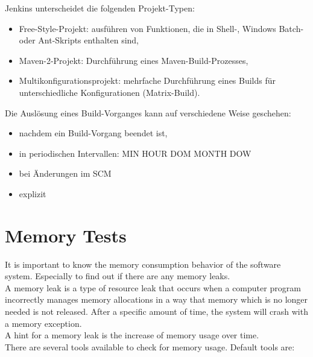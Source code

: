 Jenkins unterscheidet die folgenden Projekt-Typen:
\begin{itemize}
\item Free-Style-Projekt: ausführen von Funktionen, die in Shell-,
  Windows Batch- oder Ant-Skripts enthalten sind,
\item Maven-2-Projekt: Durchführung eines Maven-Build-Prozesses,
\item Multikonfigurationsprojekt: mehrfache Durchführung
  eines Builds für unterschiedliche Konfigurationen (Matrix-Build).
\end{itemize}
Die Auslösung eines Build-Vorganges kann auf verschiedene Weise
geschehen:
\begin{itemize}
\item nachdem ein Build-Vorgang beendet ist,
\item in periodischen Intervallen: MIN HOUR DOM MONTH DOW
\item bei Änderungen im SCM
\item explizit
\end{itemize}
%
%
\newslide

\section{Memory Tests}
It is important to know the memory consumption behavior of the
software system. Especially to find out if there are any memory leaks.\\
A memory leak is a type of resource leak that occurs when a computer
program incorrectly manages memory allocations in a way that memory which
is no longer needed is not released. After a specific amount of time,
the system will crash with a memory exception.\\
A hint for a memory leak is the increase of memory usage over time.\\
There are several tools available to check for memory usage. Default
tools are:

